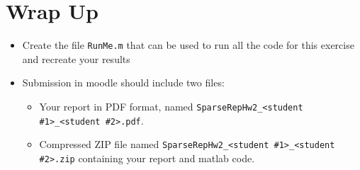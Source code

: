 \documentclass[]{article}
\newcommand{\code}{\item[\faKeyboardO]}
\begin{document}
\section*{Wrap Up}
\begin{itemize}
	\code Create the file \lstinline|RunMe.m| that can be used to run all the code for this exercise and recreate your results 
	\item Submission in moodle should include two files: 
	\begin{itemize}
		\item Your report in PDF format, named \lstinline|SparseRepHw2_<student #1>_<student #2>.pdf|.
		\item Compressed ZIP file named \lstinline|SparseRepHw2_<student #1>_<student #2>.zip| containing your report and matlab code.  
	\end{itemize}   
\end{itemize}


{}
\end{document}
